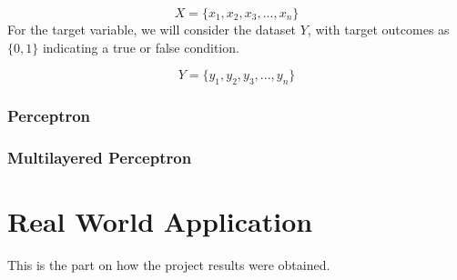 \documentclass[12pt]{article}
\begin{document}
$$
X = \lbrace x_{1}, x_{2}, x_{3}, ... , x_{n} \rbrace 
$$ 
For the target variable, we will consider the dataset $Y$, with target outcomes as 
$\lbrace0,1\rbrace$ indicating a true or false condition.

$$
Y = \lbrace y_{1}, y_{2}, y_{3}, ... , y_{n} \rbrace 
$$

\newpage
\section{Perceptron}

\newpage
\section{Multilayered Perceptron}

\newpage
\part{Real World Application}
This is the part on how the project results were obtained.\\
\end{document}
